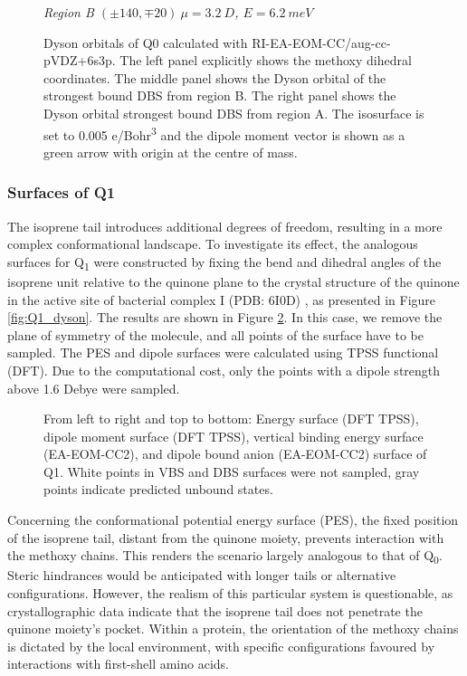 \begin{figure}[h]
\begin{minipage}[b]{0.30\textwidth}
      \small\emph{Region B $(\pm140,\mp20)~\mu=3.2~D$, $E=6.2~meV$}
  \end{minipage}
  \caption[Dyson orbitals of Q0]{Dyson orbitals of Q0 calculated with RI-EA-EOM-CC/aug-cc-pVDZ+6s3p. The left panel explicitly shows the methoxy dihedral coordinates. The middle panel shows the Dyson orbital of the strongest bound DBS from region B. The right panel shows the Dyson orbital strongest bound DBS from region A. The isosurface is set to 0.005 e/Bohr\textsuperscript{3} and the dipole moment vector is shown as a green arrow with origin at the centre of mass.}
  \label{fig:Q0_dyson}
\end{figure}


\subsubsection{Surfaces of Q1}

The isoprene tail introduces additional degrees of freedom, resulting in a more complex conformational landscape. To investigate its effect, the analogous surfaces for Q\textsubscript{1} were constructed by fixing the bend and dihedral angles of the isoprene unit relative to the quinone plane to the crystal structure of the quinone in the active site of bacterial complex I (PDB: 6I0D) \cite{gutierrez2020key}, as presented in Figure \ref{fig:Q1_dyson}. The results are shown in Figure \ref{fig:Q1_maps}. In this case, we remove the plane of symmetry of the molecule, and all points of the surface have to be sampled. The PES and dipole surfaces were calculated using TPSS functional (DFT). Due to the computational cost, only the points with a dipole strength above 1.6 Debye were sampled.

 \begin{figure}[ht!]
  \centering
  \small
  
  \caption[Surfaces of Q1]{From left to right and top to bottom: Energy surface (DFT TPSS), dipole moment surface (DFT TPSS), vertical binding energy surface (EA-EOM-CC2), and dipole bound anion (EA-EOM-CC2) surface of Q1. White points in VBS and DBS surfaces were not sampled, gray points indicate predicted unbound states.\label{fig:Q1_maps}}
\end{figure}

Concerning the conformational potential energy surface (PES), the fixed position of the isoprene tail, distant from the quinone moiety, prevents interaction with the methoxy chains. This renders the scenario largely analogous to that of Q\textsubscript{0}. Steric hindrances would be anticipated with longer tails or alternative configurations. However, the realism of this particular system is questionable, as crystallographic data \cite{taguchi2013conformational} indicate that the isoprene tail does not penetrate the quinone moiety's pocket. Within a protein, the orientation of the methoxy chains is dictated by the local environment, with specific configurations favoured by interactions with first-shell amino acids.

